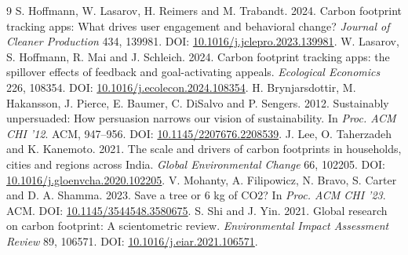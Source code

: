 \documentclass[12pt,a4paper]{article}
\begin{document}
\begin{thebibliography}{9}
 S. Hoffmann, W. Lasarov, H. Reimers and M. Trabandt. 2024. Carbon footprint tracking apps: What drives user engagement and behavioral change? \emph{Journal of Cleaner Production} 434, 139981. DOI: \href{https://doi.org/10.1016/j.jclepro.2023.139981}{10.1016/j.jclepro.2023.139981}.
 W. Lasarov, S. Hoffmann, R. Mai and J. Schleich. 2024. Carbon footprint tracking apps: the spillover effects of feedback and goal-activating appeals. \emph{Ecological Economics} 226, 108354. DOI: \href{https://doi.org/10.1016/j.ecolecon.2024.108354}{10.1016/j.ecolecon.2024.108354}.
 H. Brynjarsdottir, M. Hakansson, J. Pierce, E. Baumer, C. DiSalvo and P. Sengers. 2012. Sustainably unpersuaded: How persuasion narrows our vision of sustainability. In \emph{Proc. ACM CHI '12}. ACM, 947--956. DOI: \href{https://doi.org/10.1145/2207676.2208539}{10.1145/2207676.2208539}.
 J. Lee, O. Taherzadeh and K. Kanemoto. 2021. The scale and drivers of carbon footprints in households, cities and regions across India. \emph{Global Environmental Change} 66, 102205. DOI: \href{https://doi.org/10.1016/j.gloenvcha.2020.102205}{10.1016/j.gloenvcha.2020.102205}.
 V. Mohanty, A. Filipowicz, N. Bravo, S. Carter and D. A. Shamma. 2023. Save a tree or 6 kg of CO2? In \emph{Proc. ACM CHI '23}. ACM. DOI: \href{https://doi.org/10.1145/3544548.3580675}{10.1145/3544548.3580675}.
 S. Shi and J. Yin. 2021. Global research on carbon footprint: A scientometric review. \emph{Environmental Impact Assessment Review} 89, 106571. DOI: \href{https://doi.org/10.1016/j.eiar.2021.106571}{10.1016/j.eiar.2021.106571}.
\end{thebibliography}
\end{document}
